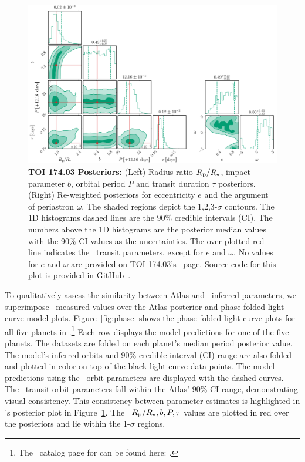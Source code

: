 \documentclass[floatfix,ApJL,twocolumn]{aastex631}
\begin{document}
\begin{figure}\label{fig:posteriors}
    \centering
    \includegraphics[width=0.9\linewidth]{figures/combined_posterior.png}
    \caption{\textbf{TOI 174.03 Posteriors:} (Left) Radius ratio $R_{\rm p}/R_\star$, impact parameter $b$, orbital period $P$ and transit duration $\tau$ posteriors. (Right) Re-weighted posteriors for eccentricity $e$ and the argument of periastron $\omega$.
    The shaded regions depict the 1,2,3-$\sigma$ contours. The 1D histograms dashed lines are the 90\% credible intervals (CI).
    The numbers above the 1D histograms are the posterior median values with the 90\% CI values as the uncertainties.
    The over-plotted red line indicates the \exofop\ transit parameters, except for $e$ and $\omega$.
    No values for $e$ and $\omega$ are provided on {TOI 174.03}'s \exofop\ page.
    Source code for this plot is provided in GitHub~\paperPlotsLink.}
\end{figure}


To qualitatively assess the similarity between Atlas and \exofop\ inferred parameters, we superimpose \exofop\ measured values over the Atlas posterior and phase-folded light curve model plots.
Figure~\ref{fig:phase} shows the phase-folded light curve plots for all five planets in .\footnote{The \tessAtlas\ catalog page for  can be found here: .}
Each row displays the model predictions for one of the five planets.
The datasets are folded on each planet's median period posterior value.
The model's inferred orbits and 90\% credible interval (CI) range are also folded and plotted in color on top of the black light curve data points.
The model predictions using the \exofop\ orbit parameters are displayed with the dashed curves.
The \exofop\ transit orbit parameters fall within the Atlas' 90\% CI range, demonstrating visual consistency.
This consistency between parameter estimates is highlighted in 's posterior plot in Figure~\ref{fig:posteriors}.
The \exofop\ $R_{\rm p}/R_{\star}, b, P, \tau$ values are plotted in red over the posteriors and lie within the 1-$\sigma$ regions.
\end{document}
